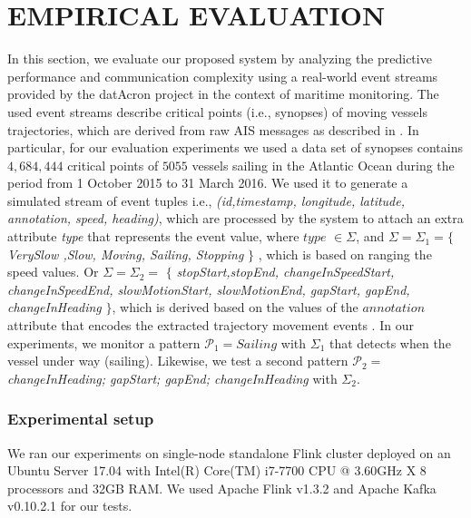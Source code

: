 \section{EMPIRICAL EVALUATION}
\label{sec:results}
In this section, we evaluate our proposed system by analyzing the predictive performance and communication complexity  using a real-world event streams provided by the datAcron project in the context of maritime monitoring. The used event streams describe critical points (i.e., synopses) of moving vessels trajectories, which are derived from raw AIS messages as described in \cite{synopses1}. In particular, for our evaluation experiments we used a data set of synopses contains $4,684,444$ critical points of $5055$ vessels sailing in the Atlantic Ocean during the period from 1 October 2015 to 31 March 2016. We used it to generate a simulated stream of event tuples  i.e., \textit{(id,timestamp, longitude, latitude, annotation, speed, heading)}, which are processed by the system to attach an extra attribute \textit{type} that represents the event value,  where $type$ $\in \Sigma$,  and $ \Sigma= \Sigma_1=$$\{$\textit{VerySlow ,Slow, Moving, Sailing, Stopping} $\}$ , which is based on ranging the speed values. Or $\Sigma=\Sigma_2=$ $\{$  \textit{stopStart,stopEnd, changeInSpeedStart, changeInSpeedEnd, slowMotionStart, slowMotionEnd, gapStart, gapEnd,   changeInHeading} $\}$, which is derived based on the values of the $annotation$ attribute that encodes the extracted trajectory movement events \cite{synopses1}. In our experiments, we monitor a pattern $\mathcal{P}_1=Sailing$ with $\Sigma_1$ that detects when the vessel under way (sailing). Likewise, we test a second pattern  $\mathcal{P}_2=$\textit{changeInHeading; gapStart; gapEnd; changeInHeading} with $\Sigma_2$.


\subsubsection*{Experimental setup} We ran our experiments on single-node standalone Flink cluster deployed on an Ubuntu Server 17.04 with Intel(R) Core(TM) i7-7700 CPU @ 3.60GHz X 8 processors and 32GB RAM. We used Apache Flink v1.3.2 and Apache Kafka v0.10.2.1 for our tests.


